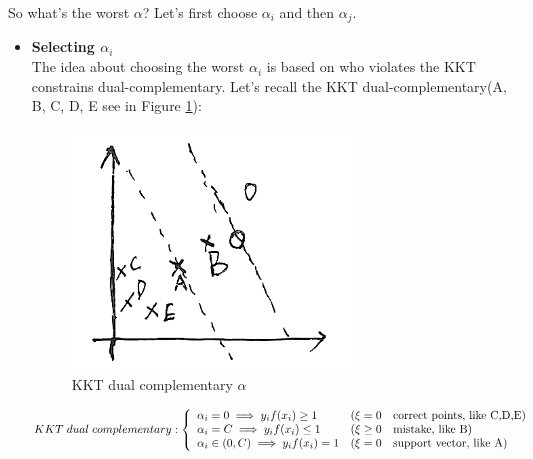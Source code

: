 \documentclass[a4paper]{article}
\begin{document}
So what's the worst $\alpha$? Let's first choose $\alpha_i$ and then $\alpha_j$. 


\begin{itemize}
\item{
\textbf{Selecting $\alpha_i$} \\
The idea about choosing the worst $\alpha_i$ is based on who violates the KKT constrains dual-complementary. Let's recall the KKT dual-complementary(A, B, C, D, E see in Figure \ref{fig:ex2}): 
\begin{figure}[h!]
  \centering
    \includegraphics[width=0.7\textwidth]{./images/ex2}
  \caption{KKT dual complementary $\alpha$}\label{fig:ex2}
\end{figure}
\[ KKT \; dual \; complementary: \left\{ 
  		\begin{array}{l l}
			\alpha_i=0 \implies y_if(x_i) \geq 1 & (\xi = 0 \quad \text{correct points, like C,D,E}) \\
			\alpha_i=C \implies y_if(x_i) \leq 1 & (\xi \geq 0 \quad \text{mistake, like B}) \\
			\alpha_i \in (0, C) \implies y_if(x_i)=1 & (\xi=0 \quad \text{support vector, like A})
 		 \end{array} \right.\]

}
\end{itemize}
\end{document}
